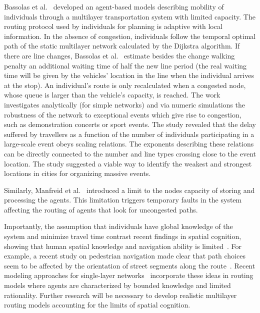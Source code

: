 Bassolas et al.~\cite{bassolas2020scaling} developed an agent-based models describing mobility of individuals through a multilayer transportation system with limited capacity. The routing protocol used by individuals for planning is adaptive with local information. In the absence of congestion, individuals follow the temporal optimal path of the static multilayer network calculated by the Dijkstra algorithm. If there are line changes, Bassolas et al.~\cite{bassolas2020scaling} estimate besides the change walking penalty an additional waiting time of half the new line period (the real waiting time will be given by the vehicles' location in the line when the individual arrives at the stop). An individual's route is only recalculated when a congested node, whose queue is larger than the vehicle’s capacity, is reached. The work investigates analytically (for simple networks) and via numeric simulations the robustness of the network to exceptional events which give rise to congestion, such as demonstration concerts or sport events. The study revealed that the delay suffered by travellers as a function of the number of individuals participating in a large-scale event obeys scaling relations. The exponents describing these relations can be directly connected to the number and line types crossing close to the event location. The study suggested a viable way to identify the weakest and strongest locations in cities for organizing massive events.

Similarly, Manfreid et al.~\cite{manfredi2018congestion} introduced a limit to the nodes capacity of storing and processing the agents. This limitation triggers temporary faults in the system affecting the routing of agents that look for uncongested paths.

Importantly, the assumption that individuals have global knowledge of the system and minimize travel time contrast recent findings in spatial cognition, showing that human spatial knowledge and navigation ability is limited~\cite{gallotti2016limits,bongiorno2021vector}. For example, a recent study on pedestrian navigation made clear that path choices seem to be affected by the orientation of street segments along the route~\cite{bongiorno2021vector}. Recent modeling approaches for single-layer networks~\cite{manley2018exploring} incorporate these ideas in routing models where agents are characterized by bounded knowledge and limited rationality. Further research will be necessary to develop realistic multilayer routing models accounting for the limits of spatial cognition.


